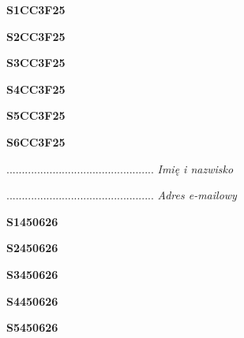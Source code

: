 \begin{turn}{90}\huge \textbf{S1CC3F25}\end{turn}

\begin{turn}{90}\huge \textbf{S2CC3F25}\end{turn}

\begin{turn}{90}\huge \textbf{S3CC3F25}\end{turn}

\begin{turn}{90}\huge \textbf{S4CC3F25}\end{turn}

\begin{turn}{90}\huge \textbf{S5CC3F25}\end{turn}

\begin{turn}{90}\huge \textbf{S6CC3F25}\end{turn}

\begin{turn}{90}\begin{minipage}{\linewidth} \vspace{20mm} ................................................  \textit{Imię i nazwisko}\end{minipage}\end{turn}

\begin{turn}{90}\begin{minipage}{\linewidth} \vspace{20mm} ................................................  \textit{Adres e-mailowy}\end{minipage}\end{turn}

\begin{turn}{90}\huge \textbf{S1450626}\end{turn}

\begin{turn}{90}\huge \textbf{S2450626}\end{turn}

\begin{turn}{90}\huge \textbf{S3450626}\end{turn}

\begin{turn}{90}\huge \textbf{S4450626}\end{turn}

\begin{turn}{90}\huge \textbf{S5450626}\end{turn}

